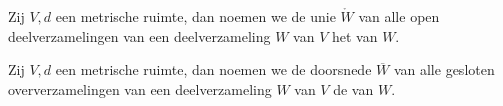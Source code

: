 \documentclass[main.tex]{subfiles}
\begin{document}
\begin{de}
  Zij $V,d$ een metrische ruimte, dan noemen we de unie $\mathring{W}$ van alle open deelverzamelingen van een deelverzameling $W$ van $V$ het  van $W$.
\end{de}

\begin{de}
  Zij $V,d$ een metrische ruimte, dan noemen we de doorsnede $\overline{W}$ van alle gesloten oververzamelingen van een deelverzameling $W$ van $V$ de  van $W$.
\end{de}
\end{document}
